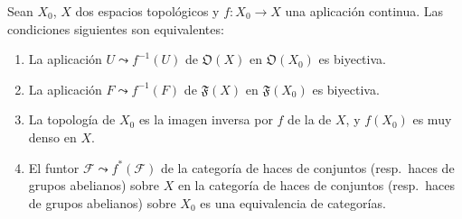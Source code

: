 \begin{proposition}[10.2.1]
\label{IV.10.2.1}
Sean $X_0$, $X$ dos espacios topológicos y $f:X_0\to X$ una aplicación continua.
Las condiciones siguientes son equivalentes:
\begin{enumerate}[label=\emph{\alph*)}]
  \item La aplicación $U\leadsto f^{-1}(U)$ de $\mathfrak O(X)$ en $\mathfrak O(X_0)$ es biyectiva.
  \item[\rm a$'$)] La aplicación $F\leadsto f^{-1}(F)$ de $\mathfrak F(X)$ en $\mathfrak F(X_0)$ es biyectiva.
  \item La topología de $X_0$ es la imagen inversa por $f$ de la de $X$, y $f(X_0)$ es muy denso  en $X$.
  \item El funtor $\mathcal F\leadsto f^*(\mathcal F)$ de la categoría de haces de conjuntos (\textup{resp.}\ haces de grupos abelianos) sobre $X$ en la categoría de haces de conjuntos (\textup{resp.}\ haces de grupos abelianos) sobre $X_0$ es una equivalencia de categorías.
\end{enumerate}
\end{proposition}

